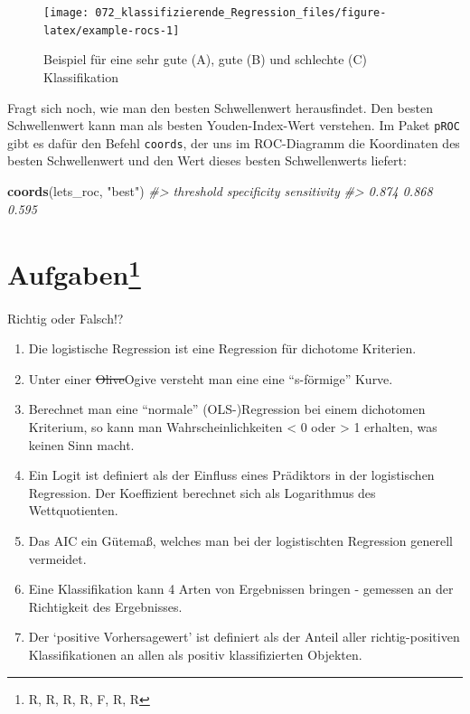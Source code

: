 \documentclass[12pt,ngerman,]{book}
\makeatletter
\newenvironment{Shaded}{\begin{snugshade}}{\end{snugshade}}
\newcommand{\KeywordTok}[1]{\textcolor[rgb]{0.13,0.29,0.53}{\textbf{#1}}}
\newcommand{\StringTok}[1]{\textcolor[rgb]{0.31,0.60,0.02}{#1}}
\newcommand{\CommentTok}[1]{\textcolor[rgb]{0.56,0.35,0.01}{\textit{#1}}}
\newcommand{\NormalTok}[1]{#1}
\let\rmarkdownfootnote\footnote%
\def\footnote{\protect\rmarkdownfootnote}
\newenvironment{kframe}{%
\medskip{}
\setlength{\fboxsep}{.8em}
 \def\at@end@of@kframe{}%
 \ifinner\ifhmode%
  \def\at@end@of@kframe{\end{minipage}}%
  \begin{minipage}{\columnwidth}%
 \fi\fi%
 \def\FrameCommand##1{\hskip\@totalleftmargin \hskip-\fboxsep
 \colorbox{shadecolor}{##1}\hskip-\fboxsep
     \hskip-\linewidth \hskip-\@totalleftmargin \hskip\columnwidth}%
 \MakeFramed {\advance\hsize-\width
   \@totalleftmargin\z@ \linewidth\hsize
   \@setminipage}}%
 {\par\unskip\endMakeFramed%
 \at@end@of@kframe}
\renewenvironment{Shaded}{\begin{kframe}}{\end{kframe}}
\theoremstyle{definition}
\theoremstyle{definition}
\theoremstyle{remark}
\let\BeginKnitrBlock\begin \let\EndKnitrBlock\end
\makeatother
\begin{document}
\begin{figure}

{\centering \texttt{[image: 072\_klassifizierende\_Regression\_files/figure-latex/example-rocs-1]} 

}

\caption{Beispiel für eine sehr gute (A), gute (B) und schlechte (C) Klassifikation}\label{fig:example-rocs}
\end{figure}

Fragt sich noch, wie man den besten Schwellenwert herausfindet. Den
besten Schwellenwert kann man als besten Youden-Index-Wert verstehen. Im
Paket \texttt{pROC} gibt es dafür den Befehl \texttt{coords}, der uns im
ROC-Diagramm die Koordinaten des besten Schwellenwert und den Wert
dieses besten Schwellenwerts liefert:

\begin{Shaded}
\begin{Highlighting}[]
\KeywordTok{coords}\NormalTok{(lets_roc, }\StringTok{"best"}\NormalTok{)}
\CommentTok{#>   threshold specificity sensitivity }
\CommentTok{#>       0.874       0.868       0.595}
\end{Highlighting}
\end{Shaded}

\section[Aufgaben]{\texorpdfstring{Aufgaben\footnote{R, R, R, R, F, R, R}}{Aufgaben}}\label{aufgaben-14}

\BeginKnitrBlock{rmdexercises}
Richtig oder Falsch!?

\begin{enumerate}
\def\labelenumi{\arabic{enumi}.}
\item
  Die logistische Regression ist eine Regression für dichotome
  Kriterien.
\item
  Unter einer \sout{Olive}Ogive versteht man eine eine ``s-förmige''
  Kurve.
\item
  Berechnet man eine ``normale'' (OLS-)Regression bei einem dichotomen
  Kriterium, so kann man Wahrscheinlichkeiten \textless{} 0 oder
  \textgreater{} 1 erhalten, was keinen Sinn macht.
\item
  Ein Logit ist definiert als der Einfluss eines Prädiktors in der
  logistischen Regression. Der Koeffizient berechnet sich als
  Logarithmus des Wettquotienten.
\item
  Das AIC ein Gütemaß, welches man bei der logistischten Regression
  generell vermeidet.
\item
  Eine Klassifikation kann 4 Arten von Ergebnissen bringen - gemessen an
  der Richtigkeit des Ergebnisses.
\item
  Der `positive Vorhersagewert' ist definiert als der Anteil aller
  richtig-positiven Klassifikationen an allen als positiv
  klassifizierten Objekten.
\end{enumerate}
\EndKnitrBlock{rmdexercises}
\end{document}
